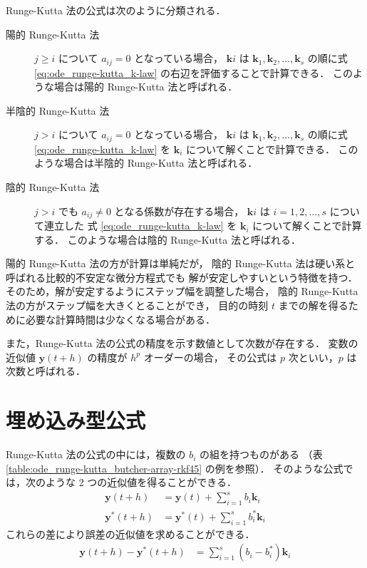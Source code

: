 Runge-Kutta 法の公式は次のように分類される．

\begin{description}
    \item[陽的 Runge-Kutta 法] $j \ge i$ について $a_{ij} = 0$ となっている場合，
          $\bm{k}i$ は $\bm{k}_1, \bm{k}_2, \ldots, \bm{k}_s$
          の順に式 \eqref{eq:ode_runge-kutta_k-law} の右辺を評価することで計算できる．
          このような場合は陽的 Runge-Kutta 法と呼ばれる．
    \item[半陰的 Runge-Kutta 法] $j > i$ について $a_{ij} = 0$ となっている場合，
          $\bm{k}i$ は $\bm{k}_1, \bm{k}_2, \ldots, \bm{k}_s$
          の順に式 \eqref{eq:ode_runge-kutta_k-law} を $\bm{k}_i$ について解くことで計算できる．
          このような場合は半陰的 Runge-Kutta 法と呼ばれる．
    \item[陰的 Runge-Kutta 法] $j > i$ でも $a_{ij} \neq 0$ となる係数が存在する場合，
          $\bm{k}i$ は $i = 1, 2, \ldots, s$ について連立した
          式 \eqref{eq:ode_runge-kutta_k-law} を $\bm{k}_i$ について解くことで計算する．
          このような場合は陰的 Runge-Kutta 法と呼ばれる．
\end{description}

陽的 Runge-Kutta 法の方が計算は単純だが，
陰的 Runge-Kutta 法は硬い系と呼ばれる比較的不安定な微分方程式でも
解が安定しやすいという特徴を持つ．
そのため，解が安定するようにステップ幅を調整した場合，
陰的 Runge-Kutta 法の方がステップ幅を大きくとることができ，
目的の時刻 $t$ までの解を得るために必要な計算時間は少なくなる場合がある．

また，Runge-Kutta 法の公式の精度を示す数値として次数が存在する．
変数の近似値 $\bm{y}(t + h)$ の精度が $h^p$ オーダーの場合，
その公式は $p$ 次といい，$p$ は次数と呼ばれる．

\section{埋め込み型公式}

Runge-Kutta 法の公式の中には，複数の $b_i$ の組を持つものがある
（表 \ref{table:ode_runge-kutta_butcher-array-rkf45} の例を参照）．
そのような公式では，次のような 2 つの近似値を得ることができる．
\begin{align}
    \bm{y}(t + h)   & = \bm{y}(t) + \sum_{i=1}^s b_i \bm{k}_i     \\
    \bm{y}^*(t + h) & = \bm{y}^*(t) + \sum_{i=1}^s b_i^* \bm{k}_i
\end{align}
これらの差により誤差の近似値を求めることができる．
\begin{align}
    \bm{y}(t + h) - \bm{y}^*(t + h) & = \sum_{i=1}^s (b_i - b_i^*) \bm{k}_i
\end{align}

